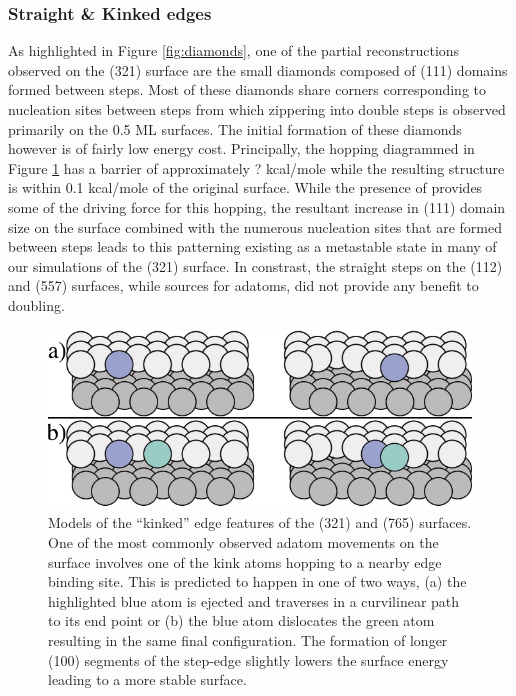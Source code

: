 \subsubsection{Straight \& Kinked edges}
As highlighted in Figure \ref{fig:diamonds}, one of the partial reconstructions
observed on the (321) surface are the small diamonds composed of (111) domains
formed between steps. Most of these diamonds share corners corresponding to
nucleation sites between steps from which zippering into double steps is
observed primarily on the 0.5 ML surfaces. The initial formation of these
diamonds however is of fairly low energy cost. Principally, the hopping
diagrammed in Figure \ref{fig:kinkSketch} has a barrier of approximately ?
kcal/mole while the resulting structure is within 0.1 kcal/mole of the original
surface. While the presence of  provides some of the driving force for
this hopping, the resultant increase in (111) domain size on the surface
combined with the numerous nucleation sites that are formed between steps leads
to this patterning existing as a metastable state in many of our simulations of
the (321) surface. In constrast, the straight steps on the (112) and (557)
surfaces, while sources for adatoms, did not provide any benefit to doubling.

\begin{figure}
  \includegraphics[width=\linewidth]{../figures/chap4/kinkMovement.pdf}
  \caption{Models of the ``kinked'' edge features of the (321) and (765)
surfaces.  One of the most commonly observed adatom movements on the surface
involves one of the kink atoms hopping to a nearby edge binding site. This is
predicted to happen in one of two ways, (a) the highlighted blue atom is
ejected and traverses in a curvilinear path to its end point or (b) the blue
atom dislocates the green atom resulting in the same final configuration. The
formation of longer (100) segments of the step-edge slightly lowers the surface
energy leading to a more stable surface.}
  \label{fig:kinkSketch}
\end{figure}

